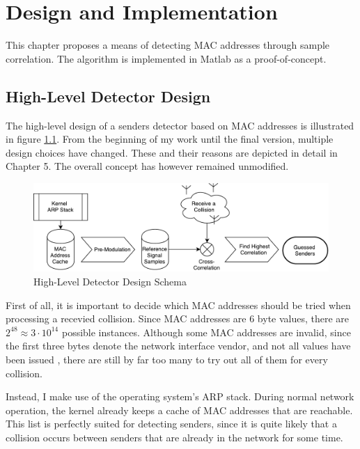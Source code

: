 
\chapter{Design and Implementation}\label{ch:design}
\glsresetall %

This chapter proposes a means of detecting MAC addresses through sample correlation. The algorithm is implemented in Matlab as a proof-of-concept.



\section{High-Level Detector Design}

The high-level design of a senders detector based on MAC addresses is illustrated in figure \ref{fig:blockdesign}. From the beginning of my work until the final version, multiple design choices have changed. These and their reasons are depicted in detail in Chapter 5. The overall concept has however remained unmodified.

\begin{figure}[H]
	\centering
	\includegraphics[width=\textwidth]{gfx/images/detector-block-design}
	\caption[High-Level Detector Design Schema]{High-Level Detector Design Schema}
	\label{fig:blockdesign}
\end{figure}

First of all, it is important to decide which MAC addresses should be tried when processing a recevied collision. Since MAC addresses are 6 byte values, there are $2^{48} \approx 3 \cdot 10^{14}$ possible instances. Although some MAC addresses are invalid, since the first three bytes denote the network interface vendor, and not all values have been issued \cite{ieeeoui}, there are still by far too many to try out all of them for every collision.

Instead, I make use of the operating system's ARP stack. During normal network operation, the kernel already keeps a cache of MAC addresses that are reachable. This list is perfectly suited for detecting senders, since it is quite likely that a collision occurs between senders that are already in the network for some time.\\

